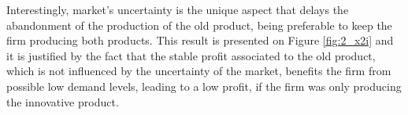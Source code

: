 

Interestingly, market's uncertainty is the unique aspect that delays the abandonment of the production of the old product, being preferable to keep the firm producing both products. This result is presented on Figure \ref{fig:2_x2i} and it is justified by the fact that the stable profit associated to the old product, which is not influenced by the uncertainty of the market, benefits the firm from possible low demand levels, leading to a low profit, if the firm was only producing the innovative product.

